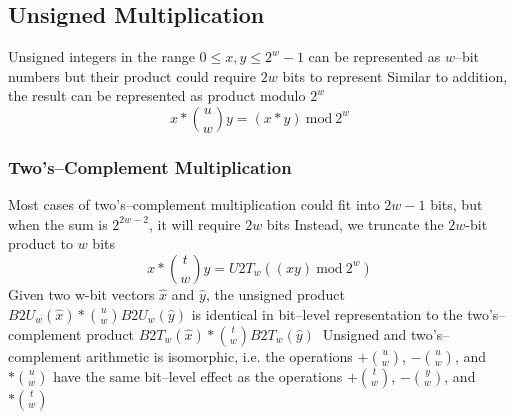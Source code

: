 \documentclass[../bryant_comp_sys.tex]{subfiles}
\begin{document}
                \subsection{Unsigned Multiplication}
                    \begin{outline}
                        \1 Unsigned integers in the range \( 0 \leq x, y \leq 2^w - 1 \) can be represented as \( w \)--bit numbers but their product could require \( 2w \) bits to represent
                        \1 Similar to addition, the result can be represented as product modulo \( 2^w \)
                            \[
                                x * \binom{u}{w}y = (x*y)~\text{mod}~2^w
                            \]
                    \end{outline}

                \subsubsection{Two's--Complement Multiplication}
                    \begin{outline}
                        \1 Most cases of two's--complement multiplication could fit into \( 2w -1 \) bits, but when the sum is \( 2^{2w - 2} \), it will require \( 2w \) bits
                        \1 Instead, we truncate the \( 2w \)-bit product to \( w \) bits
                            \[
                                x *\binom{t}{w}y = U2T_w \left( \left( xy  \right)~\text{mod}~2^w\right)
                            \]
                            \1 Given two w-bit vectors \( \hat{x} \) and \( \hat{y} \), the unsigned product \( B2U_w(\hat{x})*\binom{u}{w}B2U_w(\hat{y}) \) is identical in bit--level representation to the two's--complement product \( B2T_w(\hat{x})*\binom{t}{w}B2T_w(\hat{y}) \ \)
                            \2 Unsigned and two's--complement arithmetic is isomorphic, i.e. the operations \( +\binom{u}{w} \), \( -\binom{u}{w} \), and \( *\binom{u}{w} \) have the same bit--level effect as the operations \( +\binom{t}{w} \), \( -\binom{y}{w} \), and \( *\binom{t}{w} \)
                    \end{outline}
\end{document}
